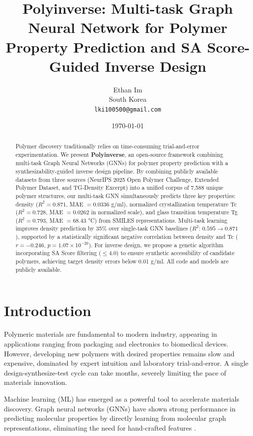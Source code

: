 \documentclass{article}
\title{\textbf{Polyinverse}: Multi-task Graph Neural Network for Polymer Property Prediction 
and SA Score-Guided Inverse Design}
\author{
  Ethan Im \\
  South Korea \\
  \texttt{lki100500@gmail.com}
}
\date{\today}
\begin{document}
\maketitle

\begin{abstract}
Polymer discovery traditionally relies on time-consuming trial-and-error experimentation.
We present \textbf{Polyinverse}, an open-source framework combining multi-task Graph Neural
Networks (GNNs) for polymer property prediction with a synthesizability-guided inverse design
pipeline. By combining publicly available datasets from three sources (NeurIPS 2025 Open Polymer
Challenge, Extended Polymer Dataset, and TG-Density Excerpt) into a unified corpus of 7,588
unique polymer structures, our multi-task GNN simultaneously predicts three key properties:
density ($R^2 = 0.871$, MAE $= 0.0336$ g/ml), normalized crystallization temperature Tc
($R^2 = 0.728$, MAE $= 0.0262$ in normalized scale), and glass transition temperature Tg
($R^2 = 0.793$, MAE $= 68.43$ °C) from SMILES representations.
Multi-task learning improves density prediction by 35\% over single-task GNN baselines
($R^2$: $0.595 \rightarrow 0.871$), supported by a statistically significant negative
correlation between density and Tc ($r = -0.246$, $p = 1.07 \times 10^{-20}$).
For inverse design, we propose a genetic algorithm incorporating SA Score filtering
($\leq 4.0$) to ensure synthetic accessibility of candidate polymers, achieving target
density errors below 0.01 g/ml. All code and models are publicly available.
\end{abstract}

\section{Introduction}

Polymeric materials are fundamental to modern industry, appearing in applications
ranging from packaging and electronics to biomedical devices. However, developing
new polymers with desired properties remains slow and expensive, dominated by
expert intuition and laboratory trial-and-error. A single design-synthesize-test
cycle can take months, severely limiting the pace of materials innovation.

Machine learning (ML) has emerged as a powerful tool to accelerate materials discovery.
Graph neural networks (GNNs) have shown strong performance in predicting molecular
properties by directly learning from molecular graph representations,
eliminating the need for hand-crafted features \citep{gcnn_polymer_2018}.
\end{document}
